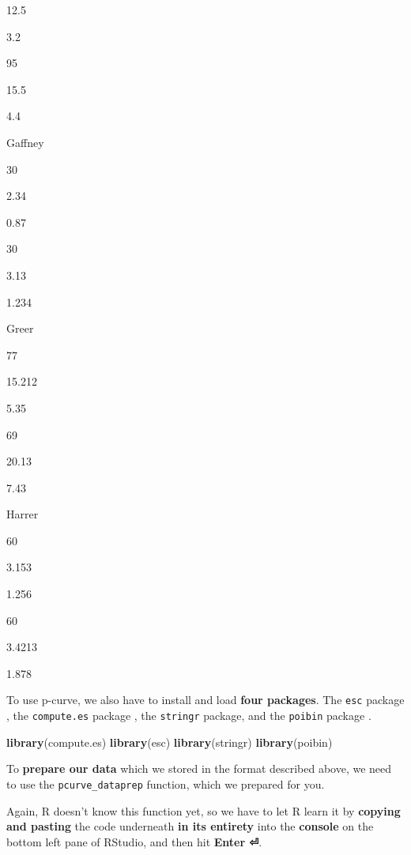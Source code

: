 \documentclass[]{book}
\newenvironment{Shaded}{\begin{snugshade}}{\end{snugshade}}
\newcommand{\KeywordTok}[1]{\textcolor[rgb]{0.13,0.29,0.53}{\textbf{#1}}}
\newcommand{\NormalTok}[1]{#1}
\begin{document}
12.5

3.2

95

15.5

4.4

Gaffney

30

2.34

0.87

30

3.13

1.234

Greer

77

15.212

5.35

69

20.13

7.43

Harrer

60

3.153

1.256

60

3.4213

1.878

To use p-curve, we also have to install and load \textbf{four packages}. The \texttt{esc} package \citep{esc}, the \texttt{compute.es} package \citep{del2013compute}, the \texttt{stringr} package, and the \texttt{poibin} package \citep{hong2011poibin}.

\begin{Shaded}
\begin{Highlighting}[]
\KeywordTok{library}\NormalTok{(compute.es)}
\KeywordTok{library}\NormalTok{(esc)}
\KeywordTok{library}\NormalTok{(stringr)}
\KeywordTok{library}\NormalTok{(poibin)}
\end{Highlighting}
\end{Shaded}

To \textbf{prepare our data} which we stored in the format described above, we need to use the \texttt{pcurve\_dataprep} function, which we prepared for you.

Again, R doesn't know this function yet, so we have to let R learn it by \textbf{copying and pasting} the code underneath \textbf{in its entirety} into the \textbf{console} on the bottom left pane of RStudio, and then hit \textbf{Enter ⏎}.
\end{document}
